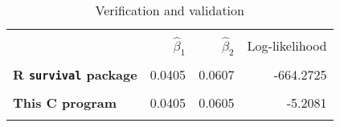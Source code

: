 \documentclass{article}
\begin{document}
\begin{table}[h!]
	\caption{Verification and validation}
	\centering
	\begin{tabular}{|l r r r|}
		\hline
		& & & \\
		& $\hat{\beta}_1$ & $\hat{\beta}_2$  & Log-likelihood\\
		& & & \\
		\textbf{R \texttt{survival} package} & 0.0405 & 0.0607&-664.2725\\
		& & & \\
		\textbf{This C program} & 0.0405  &  0.0605   &-5.2081       \\
		& & & \\
		\hline
	\end{tabular}
\end{table}
\end{document}
